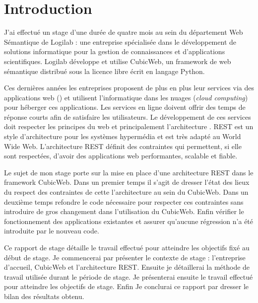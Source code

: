 \chapter*{Introduction}
J'ai effectué un stage d'une durée de quatre mois au sein du département Web Sémantique de Logilab : une entreprise spécialisée dans le développement de solutions informatique pour la gestion de connaissances et d'applications scientifiques. Logilab développe et utilise CubicWeb, un framework de web sémantique distribué sous la licence libre  écrit en langage Python. 

Ces dernières années les entreprises proposent de plus en plus leur services via des applications web (\textit{}) et utilisent l'informatique dans les nuages (\textit{cloud computing}) pour héberger ces applications. Les services en ligne doivent offrir des temps de réponse courts afin de satisfaire les utilisateurs. Le développement de ces services doit respecter les principes du web et principalement l'architecture . REST est un style d'architecture pour les systèmes hypermédia et est très adapté au World Wide Web. L'architecture REST définit des contraintes qui permettent, si elle sont respectées, d'avoir des applications web performantes, scalable et fiable.

Le sujet de mon stage porte sur la mise en place d'une architecture REST dans le framework CubicWeb. Dans un premier temps il s'agit de dresser l'état des lieux du respect des contraintes de cette l'architecture au sein du CubicWeb. Dans un deuxième temps refondre le code nécessaire pour respecter ces contraintes sans introduire de gros changement dans l'utilisation du CubicWeb. Enfin vérifier le fonctionnement des applications existantes et assurer qu'aucune régression n'a été introduite par le nouveau code.

Ce rapport de stage détaille le travail effectué pour atteindre les objectifs fixé au début de stage. Je commencerai par présenter le contexte de stage : l'entreprise d'accueil, CubicWeb et l'architecture REST. Ensuite je détaillerai la méthode de travail utilisée durant le période de stage. Je présenterai ensuite le travail effectué pour atteindre les objectifs de stage. Enfin Je conclurai ce rapport par dresser le bilan des résultats obtenu.